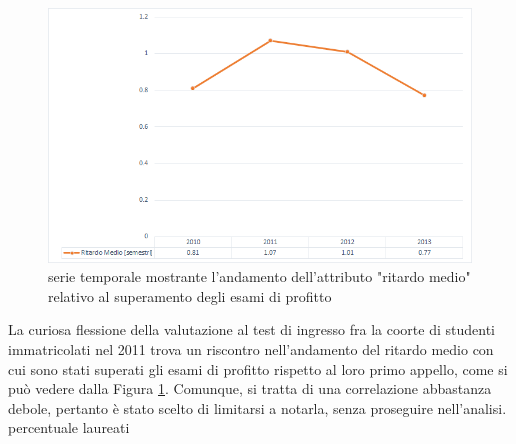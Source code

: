     \begin{figure}
        \centering
        \caption{serie temporale mostrante l'andamento dell'attributo "ritardo medio" relativo al superamento degli esami di profitto}
        \label{ritardo}
        \includegraphics[scale=0.45]{../visual/stud_3.png}
    \end{figure}

    La curiosa flessione della valutazione al test di ingresso fra la coorte di studenti immatricolati nel 2011 trova un riscontro nell'andamento del ritardo medio con cui sono stati superati gli esami di profitto rispetto al loro primo appello, come si può vedere dalla Figura \ref{ritardo}. Comunque, si tratta di una correlazione abbastanza debole, pertanto è stato scelto di limitarsi a notarla, senza proseguire nell'analisi. \\

    percentuale laureati
